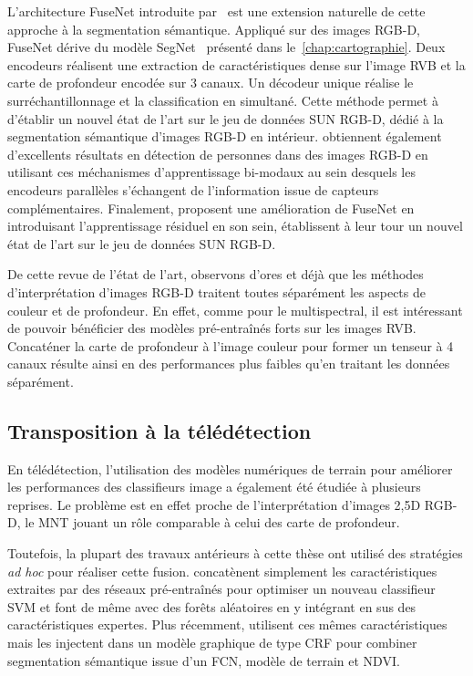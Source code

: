 L'architecture FuseNet introduite par~\citet{hazirbas_fusenet_2016} est une extension naturelle de cette approche à la segmentation sémantique. Appliqué sur des images \gls{RGB-D}, FuseNet dérive du modèle SegNet~\cite{badrinarayanan_segnet_2017} présenté dans le~\cref{chap:cartographie}. Deux encodeurs réalisent une extraction de caractéristiques dense sur l'image \gls{RVB} et la carte de profondeur encodée sur 3 canaux. Un décodeur unique réalise le surréchantillonnage et la classification en simultané. Cette méthode permet à \citet{hazirbas_fusenet_2016} d'établir un nouvel état de l'art sur le jeu de données SUN RGB-D, dédié à la segmentation sémantique d'images \gls{RGB-D} en intérieur. \citet{guerry_look_2017} obtiennent également d'excellents résultats en détection de personnes dans des images \gls{RGB-D} en utilisant ces méchanismes d'apprentissage bi-modaux au sein desquels les encodeurs parallèles s'échangent de l'information issue de capteurs complémentaires. Finalement, \citet{lee_rdfnet_2017} proposent une amélioration de FuseNet en introduisant l'apprentissage résiduel en son sein, établissent à leur tour un nouvel état de l'art sur le jeu de données SUN RGB-D.

De cette revue de l'état de l'art, observons d'ores et déjà que les méthodes d'interprétation d'images \gls{RGB-D} traitent toutes séparément les aspects de couleur et de profondeur. En effet, comme pour le multispectral, il est intéressant de pouvoir bénéficier des modèles pré-entraînés forts sur les images \gls{RVB}. Concaténer la carte de profondeur à l'image couleur pour former un tenseur à 4 canaux résulte ainsi en des performances plus faibles qu'en traitant les données séparément.

\subsection{Transposition à la télédétection}

En télédétection, l'utilisation des modèles numériques de terrain pour améliorer les performances des classifieurs image a également été étudiée à plusieurs reprises. Le problème est en effet proche de l'interprétation d'images 2,5D \gls{RGB-D}, le \gls{MNT} jouant un rôle comparable à celui des carte de profondeur.

Toutefois, la plupart des travaux antérieurs à cette thèse ont utilisé des stratégies \emph{ad hoc} pour réaliser cette fusion. \citet{lagrange_benchmarking_2015} concatènent simplement les caractéristiques extraites par des réseaux pré-entraînés pour optimiser un nouveau classifieur \gls{SVM} et \citet{paisitkriangkrai_effective_2015} font de même avec des forêts aléatoires en y intégrant en sus des caractéristiques expertes. Plus récemment, \citet{liu_dense_2017} utilisent ces mêmes caractéristiques mais les injectent dans un modèle graphique de type \gls{CRF} pour combiner segmentation sémantique issue d'un \gls{FCN}, modèle de terrain et \gls{NDVI}.

